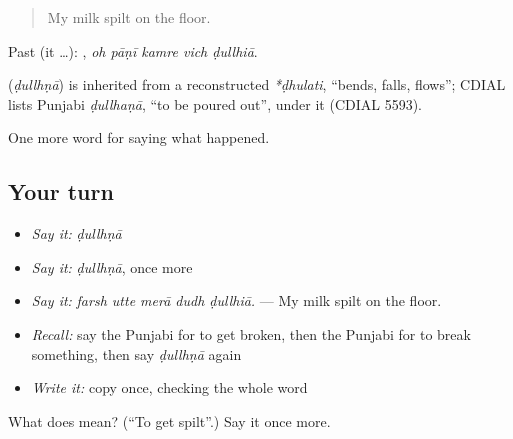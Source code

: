 \begin{quote}
My milk spilt on the floor.
\end{quote}

Past (it …):     , \emph{oh pāṇī kamre vich ḍullhiā}.

\begin{cousinweb}
\textbf{} (\emph{ḍullhṇā}) is inherited from a reconstructed \emph{*ḍhulati}, \textquotedblleft{}bends, falls, flows\textquotedblright{}; CDIAL lists Punjabi \emph{ḍullhaṇā}, \textquotedblleft{}to be poured out\textquotedblright{}, under it (CDIAL 5593).
\end{cousinweb}

\begin{grammarlens}[title={What you've built}]
One more word for saying what happened.
\end{grammarlens}

\subsection*{Your turn}
\begin{itemize}
\raggedright
  \item \emph{Say it:} \emph{ḍullhṇā}
  \item \emph{Say it:} \emph{ḍullhṇā}, once more
  \item \emph{Say it:} \emph{farsh utte merā dudh ḍullhiā.} — My milk spilt on the floor.
  \item \emph{Recall:} say the Punjabi for to get broken, then the Punjabi for to break something, then say \emph{ḍullhṇā} again
  \item \emph{Write it:} copy \textbf{} once, checking the whole word
\end{itemize}

\begin{tcolorbox}[breakable,colback=teal!4,colframe=teal!35!black,title={Before you move on}]
What does  mean? (\textquotedblleft{}To get spilt\textquotedblright{}.) Say it once more.
\end{tcolorbox}

